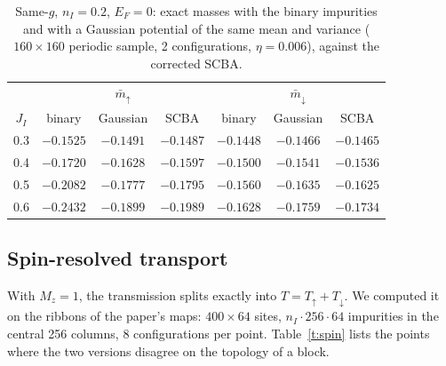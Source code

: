 \documentclass[11pt,a4paper]{article}
\newcommand{\up}{{\uparrow}}
\newcommand{\dn}{{\downarrow}}
\begin{document}
\begin{table}[t]
\centering
\caption{\label{t:gauss}Same-$g$, $n_I=0.2$, $E_F=0$: exact masses with the binary impurities
and with a Gaussian potential of the same mean and variance ($160\times160$ periodic sample,
2 configurations, $\eta=0.006$), against the corrected SCBA.}
\begin{tabular}{ccccccc}
\toprule
 & \multicolumn{3}{c}{$\bar m_\up$} & \multicolumn{3}{c}{$\bar m_\dn$}\\
$J_I$ & binary & Gaussian & SCBA & binary & Gaussian & SCBA\\
\midrule
0.3 & $-0.1525$ & $-0.1491$ & $-0.1487$ & $-0.1448$ & $-0.1466$ & $-0.1465$\\
0.4 & $-0.1720$ & $-0.1628$ & $-0.1597$ & $-0.1500$ & $-0.1541$ & $-0.1536$\\
0.5 & $-0.2082$ & $-0.1777$ & $-0.1795$ & $-0.1560$ & $-0.1635$ & $-0.1625$\\
0.6 & $-0.2432$ & $-0.1899$ & $-0.1989$ & $-0.1628$ & $-0.1759$ & $-0.1734$\\
\bottomrule
\end{tabular}
\end{table}

\subsection{Spin-resolved transport}\label{s:spin}

With $M_z=1$, the transmission splits exactly into $T=T_\up+T_\dn$. We computed it on the ribbons
of the paper's maps: $400\times64$ sites, $n_I\cdot256\cdot64$ impurities in the central 256
columns, 8 configurations per point. Table~\ref{t:spin} lists the points where the two versions
disagree on the topology of a block.
\end{document}
